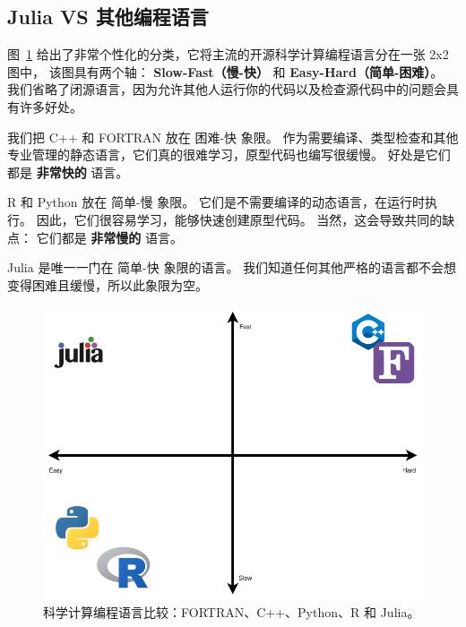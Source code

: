 \documentclass[
  notoc %
]{tufte-book}
\begin{document}
\hypertarget{julia-vs-ux5176ux4ed6ux7f16ux7a0bux8bedux8a00}{%
\subsection{Julia VS
其他编程语言}\label{julia-vs-ux5176ux4ed6ux7f16ux7a0bux8bedux8a00}}

图~\ref{fig:language_comparison}
给出了非常个性化的分类，它将主流的开源科学计算编程语言分在一张 2x2
图中， 该图具有两个轴： \textbf{Slow-Fast（慢-快）} 和
\textbf{Easy-Hard（简单-困难）}。
我们省略了闭源语言，因为允许其他人运行你的代码以及检查源代码中的问题会具有许多好处。

我们把 C++ 和 FORTRAN 放在 困难-快 象限。
作为需要编译、类型检查和其他专业管理的静态语言，它们真的很难学习，原型代码也编写很缓慢。
好处是它们都是 \textbf{非常快的} 语言。

R 和 Python 放在 简单-慢 象限。
它们是不需要编译的动态语言，在运行时执行。
因此，它们很容易学习，能够快速创建原型代码。 当然，这会导致共同的缺点：
它们都是 \textbf{非常慢的} 语言。

Julia 是唯一一门在 简单-快 象限的语言。
我们知道任何其他严格的语言都不会想变得困难且缓慢，所以此象限为空。

\begin{figure}
\hypertarget{fig:language_comparison}{%
\centering
\includegraphics{images/language_comparisons.png}
\caption{科学计算编程语言比较：FORTRAN、C++、Python、R 和
Julia。}\label{fig:language_comparison}
}
\end{figure}
\end{document}
